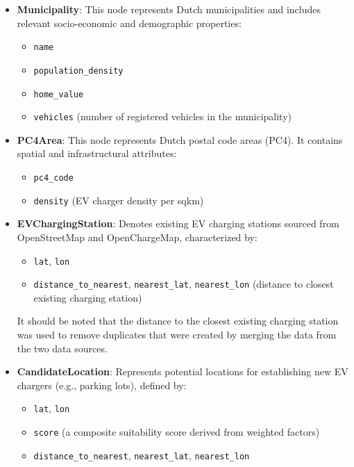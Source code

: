 \documentclass{article}
\begin{document}
\begin{itemize}

	\item \textbf{Municipality}: This node represents Dutch municipalities and includes relevant socio-economic and demographic properties:
	      \begin{itemize}
		      \item \texttt{name}
		      \item \texttt{population\_density}
		      \item \texttt{home\_value}
		      \item \texttt{vehicles} (number of registered vehicles in the municipality)
	      \end{itemize}

	\item \textbf{PC4Area}: This node represents Dutch postal code areas (PC4). It contains spatial and infrastructural attributes:
	      \begin{itemize}
		      \item \texttt{pc4\_code}
		      \item \texttt{density} (EV charger density per sqkm)
	      \end{itemize}

	\item \textbf{EVChargingStation}: Denotes existing EV charging stations sourced from OpenStreetMap and OpenChargeMap, characterized by:
	      \begin{itemize}
		      \item \texttt{lat}, \texttt{lon}
		      \item \texttt{distance\_to\_nearest}, \texttt{nearest\_lat}, \texttt{nearest\_lon} (distance to closest existing charging station)
	      \end{itemize}
	      It should be noted that the distance to the closest existing charging station was used to remove duplicates that were created by merging the data from the two data sources.

	\item \textbf{CandidateLocation}: Represents potential locations for establishing new EV chargers (e.g., parking lots), defined by:
	      \begin{itemize}
		      \item \texttt{lat}, \texttt{lon}
		      \item \texttt{score} (a composite suitability score derived from weighted factors)
		      \item \texttt{distance\_to\_nearest}, \texttt{nearest\_lat}, \texttt{nearest\_lon}
	      \end{itemize}

\end{itemize}
\end{document}

